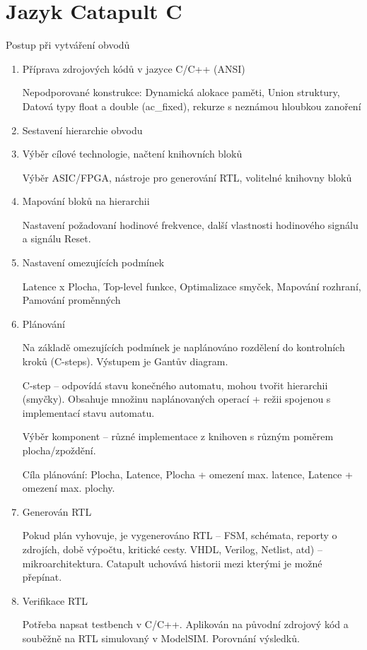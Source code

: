 \documentclass[a4paper, 11pt]{report}
\begin{document}
\section{Jazyk Catapult C}
Postup při vytváření obvodů
\begin{enumerate}
	\item Příprava zdrojových kódů v jazyce C/C++ (ANSI)
	
	Nepodporované konstrukce: Dynamická alokace paměti, Union struktury, Datová typy float a double (ac\_fixed), rekurze s neznámou hloubkou zanoření
	\item Sestavení hierarchie obvodu
	\item Výběr cílové technologie, načtení knihovních bloků
	
	Výběr ASIC/FPGA, nástroje pro generování RTL, volitelné knihovny bloků
	\item Mapování bloků na hierarchii
	
	Nastavení požadovaní hodinové frekvence, další vlastnosti hodinového signálu a signálu Reset.
	\item Nastavení omezujících podmínek
	
	Latence x Plocha, Top-level funkce, Optimalizace smyček, Mapování rozhraní, Pamování proměnných
	\item Plánování
	
	Na základě omezujících podmínek je naplánováno rozdělení do kontrolních kroků (C-steps). Výstupem je Gantův diagram.
	
	C-step -- odpovídá stavu konečného automatu, mohou tvořit hierarchii (smyčky). Obsahuje množinu naplánovaných operací + režii spojenou s implementací stavu automatu.
	
	Výběr komponent -- různé implementace z knihoven s různým poměrem plocha/zpoždění.
	
	Cíla plánování: Plocha, Latence, Plocha + omezení max. latence, Latence + omezení max. plochy.
	\item Generován RTL
	
	Pokud plán vyhovuje, je vygenerováno RTL -- FSM, schémata, reporty o zdrojích, době výpočtu, kritické cesty. VHDL, Verilog, Netlist, atd) -- mikroarchitektura. Catapult uchovává historii  mezi kterými je možné přepínat.
	\item Verifikace RTL
	
	Potřeba napsat testbench v C/C++. Aplikován na původní zdrojový kód a souběžně na RTL simulovaný v ModelSIM. Porovnání výsledků.
\end{enumerate}
\end{document}
